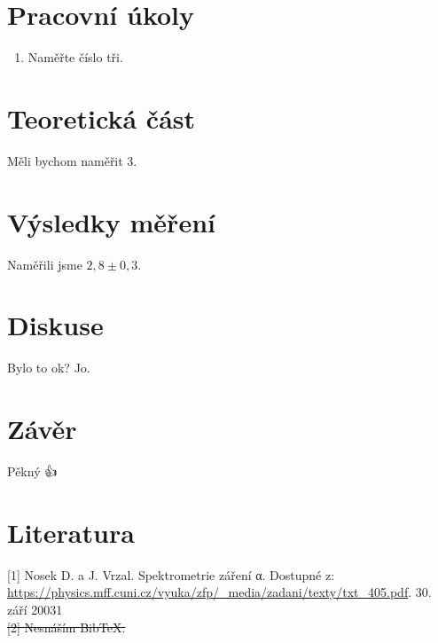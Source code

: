 \documentclass[10pt,a4paper]{article}
\newcommand{\°}{\degree}
\begin{document}

\setmainfont{Linux Libertine O}




\section{Pracovní úkoly}
\begin{enumerate}
    \item Naměřte číslo tři.
\end{enumerate}

\section{Teoretická část}
Měli bychom naměřit 3.

\section{Výsledky měření}
Naměřili jsme $2,8 \pm 0,3$.


\section{Diskuse}
Bylo to ok? Jo.

\section{Závěr}
Pěkný 👍️


\section{Literatura}
[1] Nosek D. a J. Vrzal. Spektrometrie záření α. Dostupné z: \url{https://physics.mff.cuni.cz/vyuka/zfp/_media/zadani/texty/txt_405.pdf}. 30. září 20031
\\
\st{[2] Nesnáším BibTeX.}
\end{document}
